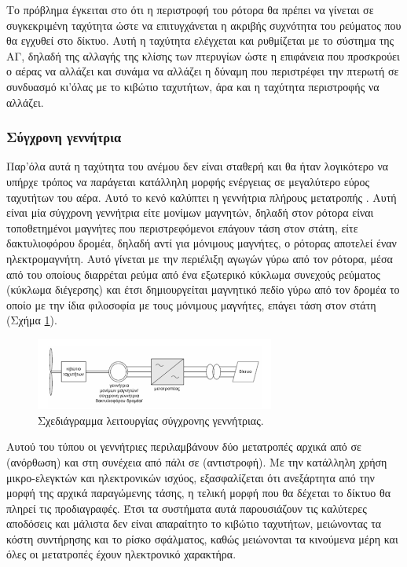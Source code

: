 \documentclass[12pt]{report}
\begin{document}
Το πρόβλημα έγκειται στο ότι η περιστροφή του ρότορα θα πρέπει να γίνεται σε συγκεκριμένη ταχύτητα ώστε να επιτυγχάνεται η ακριβής συχνότητα του ρεύματος που θα εγχυθεί στο δίκτυο. 
Αυτή η ταχύτητα ελέγχεται και ρυθμίζεται με το σύστημα {} της ΑΓ, δηλαδή της αλλαγής της κλίσης των πτερυγίων ώστε η επιφάνεια που προσκρούει ο αέρας να αλλάζει και συνάμα να αλλάζει η δύναμη που περιστρέφει
την πτερωτή σε συνδυασμό κι'όλας με το κιβώτιο ταχυτήτων, άρα και η ταχύτητα περιστροφής να αλλάζει.

\subsubsection{Σύγχρονη γεννήτρια}
Παρ'όλα αυτά η ταχύτητα του ανέμου δεν είναι σταθερή και θα ήταν λογικότερο να υπήρχε τρόπος να παράγεται κατάλληλη μορφής ενέργειας σε μεγαλύτερο εύρος ταχυτήτων του αέρα. Αυτό το κενό καλύπτει η γεννήτρια πλήρους μετατροπής
{}. Αυτή είναι μία σύγχρονη γεννήτρια είτε μονίμων μαγνητών, δηλαδή στον ρότορα είναι τοποθετημένοι μαγνήτες που περιστρεφόμενοι επάγουν τάση στον στάτη, είτε δακτυλιοφόρου δρομέα, 
δηλαδή αντί για μόνιμους μαγνήτες, ο ρότορας αποτελεί έναν ηλεκτρομαγνήτη. Αυτό γίνεται με την περιέλιξη αγωγών γύρω από τον ρότορα, μέσα από του οποίους διαρρέται ρεύμα από ένα εξωτερικό κύκλωμα συνεχούς ρεύματος 
(κύκλωμα διέγερσης) και έτσι δημιουργείται μαγνητικό πεδίο γύρω από τον δρομέα το οποίο με την ίδια φιλοσοφία με τους μόνιμους μαγνήτες, επάγει τάση στον στάτη (Σχήμα \ref{fig:direct-drive}). 

\begin{figure}[h]
				\center
				\includegraphics[width=0.7\textwidth]{direct-drive}
				\captionsetup{width=0.8\textwidth}
				\caption{Σχεδιάγραμμα λειτουργίας σύγχρονης γεννήτριας.}
				\label{fig:direct-drive}
\end{figure}

Αυτού του τύπου οι γεννήτριες περιλαμβάνουν δύο μετατροπές αρχικά από {} σε {} (ανόρθωση) και στη συνέχεια από {} πάλι σε {} (αντιστροφή). 
Με την κατάλληλη χρήση μικρο-ελεγκτών και ηλεκτρονικών ισχύος, εξασφαλίζεται ότι ανεξάρτητα από την μορφή της αρχικά παραγώμενης τάσης, η τελική μορφή που θα δέχεται το δίκτυο θα πληρεί τις προδιαγραφές.
Έτσι τα συστήματα αυτά παρουσιάζουν τις καλύτερες αποδόσεις και μάλιστα δεν είναι απαραίτητο το κιβώτιο ταχυτήτων, μειώνοντας τα κόστη συντήρησης και το ρίσκο σφάλματος, καθώς μειώνονται τα κινούμενα μέρη και όλες οι μετατροπές
έχουν ηλεκτρονικό χαρακτήρα. 
\end{document}
